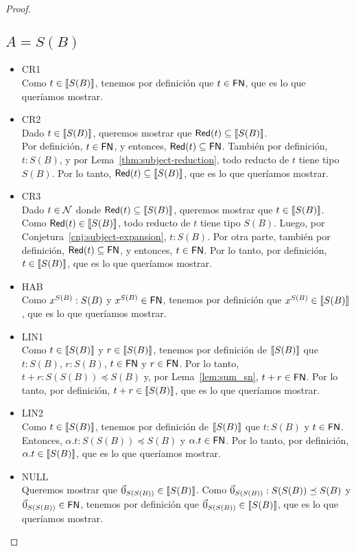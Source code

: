 \begin{proof}
  \subsection*{\( A = S(B) \)}
  \begin{itemize}
    \item CR1
      \\ Como \( t \in \llbracket S(B)\rrbracket \), tenemos por definición que \( t \in \mathsf{FN} \), que es lo que queríamos mostrar.
    \item CR2
      \\ Dado \( t \in \llbracket S(B)\rrbracket \), queremos mostrar que \( \mathsf{Red} (t) \subseteq \llbracket S(B)\rrbracket \).
      \\ Por definición, \( t \in \mathsf{FN} \), y entonces, \( \mathsf{Red} (t) \subseteq \mathsf{FN} \). También por definición, \( t : S(B) \), y por Lema~\ref{thm:subject-reduction}, todo reducto de \( t \) tiene tipo \( S(B) \). Por lo tanto, \( \mathsf{Red} (t) \subseteq \llbracket S(B)\rrbracket \), que es lo que queríamos mostrar.
    \item CR3
      \\ Dado \( t \in \mathcal{N} \) donde \( \mathsf{Red} (t) \subseteq \llbracket S(B)\rrbracket \), queremos mostrar que \( t \in \llbracket S(B)\rrbracket \).
      \\ Como \( \mathsf{Red} (t) \in \llbracket S(B)\rrbracket \), todo reducto de \( t \) tiene tipo \( S(B) \). Luego, por Conjetura~\ref{cnj:subject-expansion}, \( t : S(B) \). Por otra parte, también por definición, \( \mathsf{Red} (t) \subseteq \mathsf{FN} \), y entonces, \( t \in \mathsf{FN} \). Por lo tanto, por definición, \( t \in \llbracket S(B)\rrbracket \), que es lo que queríamos mostrar.
    \item HAB
      \\ Como \( x^{S(B)} : S(B) \) y \( x^{S(B)} \in \mathsf{FN} \), tenemos por definición que \( x^{S(B)} \in \llbracket S(B)\rrbracket \), que es lo que queríamos mostrar.
    \item LIN1
      \\ Como \( t \in \llbracket S(B)\rrbracket \) y \( r \in \llbracket S(B)\rrbracket \), tenemos por definición de \( \llbracket S(B)\rrbracket \) que \( t : S(B) \), \( r : S(B) \), \( t \in \mathsf{FN} \) y \( r \in \mathsf{FN} \). Por lo tanto, \( t + r : S(S(B)) \preceq S(B) \) y, por Lema~\ref{lem:sum_sn}, \( t + r \in \mathsf{FN} \). Por lo tanto, por definición, \( t + r \in \llbracket S(B)\rrbracket \), que es lo que queríamos mostrar.
    \item LIN2
      \\ Como \( t \in \llbracket S(B)\rrbracket \), tenemos por definición de \( \llbracket S(B)\rrbracket \) que \( t : S(B) \) y \( t \in \mathsf{FN} \). Entonces, \( \alpha . t : S(S(B)) \preceq S(B) \) y \( \alpha . t \in \mathsf{FN} \). Por lo tanto, por definición, \( \alpha . t \in \llbracket S(B)\rrbracket \), que es lo que queríamos mostrar.
    \item NULL
      \\ Queremos mostrar que \( \vec{0}_{S (S(B))} \in \llbracket S(B)\rrbracket \). Como \( \vec{0}_{S (S(B))} : S(S(B)) \preceq S(B) \) y \( \vec{0}_{S (S(B))} \in \mathsf{FN} \), tenemos por definición que \( \vec{0}_{S (S(B))} \in \llbracket S(B)\rrbracket \), que es lo que queríamos mostrar.
      \qedhere
  \end{itemize}
\end{proof}

